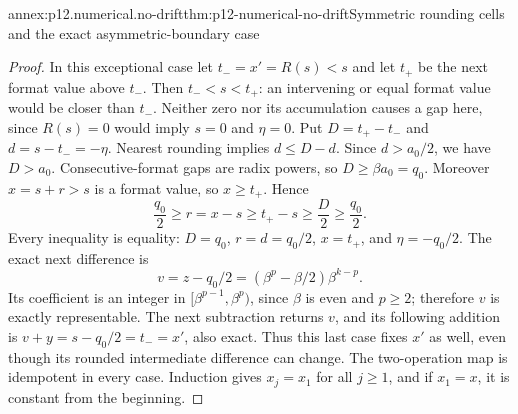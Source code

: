 \begin{annexitem}{annex:p12.numerical.no-drift}{thm:p12-numerical-no-drift}{Symmetric rounding cells and the exact asymmetric-boundary case}
\begin{proof}
In this exceptional case let \(t_-=x'=R(s)<s\) and let
\(t_+\) be the next format value above \(t_-\). Then
\(t_-<s<t_+\): an intervening or equal format value would be
closer than \(t_-\). Neither zero nor its accumulation causes a
gap here, since \(R(s)=0\) would imply \(s=0\) and \(\eta=0\).
Put \(D=t_+-t_-\) and \(d=s-t_-=-\eta\).
Nearest rounding implies \(d\leq D-d\). Since \(d>a_0/2\),
we have \(D>a_0\). Consecutive-format gaps are radix powers,
so \(D\geq\beta a_0=q_0\). Moreover \(x=s+r>s\) is a format
value, so \(x\geq t_+\). Hence
\[
 \frac{q_0}{2}\geq r=x-s\geq t_+-s
 \geq\frac D2\geq\frac{q_0}{2}.
\]
Every inequality is equality: \(D=q_0\), \(r=d=q_0/2\),
\(x=t_+\), and \(\eta=-q_0/2\). The exact next difference is
\[
 v=z-q_0/2=(\beta^p-\beta/2)\beta^{k-p}.
\]
Its coefficient is an integer in
\([\beta^{p-1},\beta^p)\), since \(\beta\) is even and
\(p\geq2\); therefore \(v\) is exactly representable.
The next subtraction returns \(v\), and its following addition
is \(v+y=s-q_0/2=t_-=x'\), also exact. Thus this last case fixes
\(x'\) as well, even though its rounded intermediate difference
can change. The two-operation map is idempotent in every case.
Induction gives \(x_j=x_1\) for all \(j\geq1\), and if
\(x_1=x\), it is constant from the beginning.
\end{proof}
\end{annexitem}

